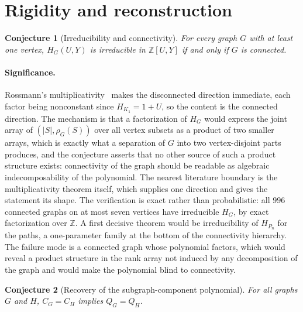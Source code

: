 \documentclass[11pt]{article}
\newtheorem{conjecture}{Conjecture}
\theoremstyle{definition}
\newcommand{\Z}{\mathbb Z}
\providecommand{\Z}{\mathbb Z}
\begin{document}
\section{Rigidity and reconstruction}

\begin{conjecture}[Irreducibility and connectivity]\label{u1}
For every graph $G$ with at least one vertex, $H_G(U,Y)$ is irreducible in $\Z[U,Y]$ if and only if $G$ is connected.
\end{conjecture}

\paragraph{Significance.}
Rossmann's multiplicativity~\cite{Ros22} makes the disconnected direction immediate, each factor being nonconstant since $H_{K_1}=1+U$, so the content is the connected direction.  The mechanism is that a factorization of $H_G$ would express the joint array of $(|S|,\rho_G(S))$ over all vertex subsets as a product of two smaller arrays, which is exactly what a separation of $G$ into two vertex-disjoint parts produces, and the conjecture asserts that no other source of such a product structure exists: connectivity of the graph should be readable as algebraic indecomposability of the polynomial.  The nearest literature boundary is the multiplicativity theorem itself, which supplies one direction and gives the statement its shape.  The verification is exact rather than probabilistic: all $996$ connected graphs on at most seven vertices have irreducible $H_G$, by exact factorization over $\Z$.  A first decisive theorem would be irreducibility of $H_{P_n}$ for the paths, a one-parameter family at the bottom of the connectivity hierarchy.  The failure mode is a connected graph whose polynomial factors, which would reveal a product structure in the rank array not induced by any decomposition of the graph and would make the polynomial blind to connectivity.


\begin{conjecture}[Recovery of the subgraph-component polynomial]\label{u2}
For all graphs $G$ and $H$, $C_G=C_H$ implies $Q_G=Q_H$.
\end{conjecture}
\end{document}
